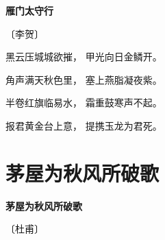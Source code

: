 \documentclass[12pt,UTF-8,openany,fontset=none]{ctexbook}
\begin{document}
\begin{center}
    {\bfseries 雁门太守行}

    \vspace{18pt}

    \begin{large}\xuwen
        〔李贺〕
    \end{large}

\end{center}

    \vspace{18pt}  %

\begin{center}
    \begin{Large}

        黑云压城城欲摧， 甲光向日金鳞开。

        角声满天秋色里， 塞上燕脂凝夜紫。

        半卷红旗临易水， 霜重鼓寒声不起。

        报君黄金台上意， 提携玉龙为君死。

    \end{Large}

\end{center}

\vspace{8pt}
\clearpage

\section{茅屋为秋风所破歌}


\begin{center}
    {\bfseries 茅屋为秋风所破歌}

    \vspace{18pt}

    \begin{large}\xuwen
        〔杜甫〕
    \end{large}

\end{center}

    \vspace{18pt}  %
\end{document}
